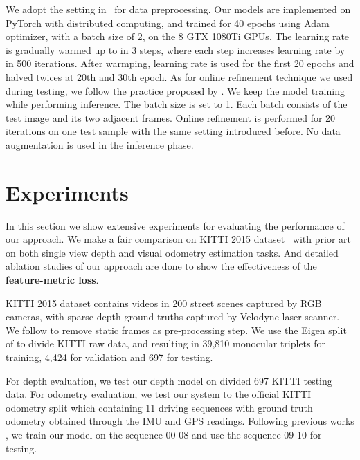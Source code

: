 \documentclass[runningheads]{llncs}
\begin{document}
We adopt the setting in~\cite{monodepth2} for data preprocessing.
Our models are implemented on PyTorch \cite{pytorch} with distributed computing, and trained for 40 epochs using Adam~\cite{adam} optimizer, with a batch size of 2, on the 8 GTX 1080Ti GPUs.
The learning rate is gradually warmed up to  in 3 steps, where each step increases learning rate by  in 500 iterations. After warmping, learning rate  is used for the first 20 epochs and halved twices at 20th and 30th epoch.
As for online refinement technique we used during testing, we follow the practice proposed by \cite{glnet,struct2depth}. 
We keep the model training while performing inference.
The batch size is set to 1. 
Each batch consists of the test image and its two adjacent frames. 
Online refinement is performed for 20 iterations on one test sample with the same setting introduced before. 
No data augmentation is used in the inference phase.
 \section{Experiments}
\label{exp}

In this section we show extensive experiments for evaluating the performance of our approach. We make a fair comparison on KITTI 2015 dataset~\cite{kitti} with prior art on both single view depth and visual odometry estimation tasks. 
And detailed ablation studies of our approach are done to show the effectiveness of the \textbf{feature-metric loss}.
    
KITTI 2015 dataset contains videos in 200 street scenes captured by RGB cameras, with sparse depth ground truths captured by Velodyne laser scanner.
We follow \cite{sfmlearner} to remove static frames as pre-processing step.
We use the Eigen split of \cite{Eigen} to divide KITTI raw data, and resulting in 39,810 monocular triplets for training, 4,424 for validation and 697 for testing.

For depth evaluation, we test our depth model on divided 697 KITTI testing data. 
For odometry evaluation, we test our system to the official KITTI odometry split which containing 11 driving sequences with ground truth odometry obtained through the IMU and GPS readings. 
Following previous works \cite{dfr,sc-sfmlearner,sfmlearner}, we train our model on the sequence 00-08 and use the sequence 09-10 for testing.
\end{document}
